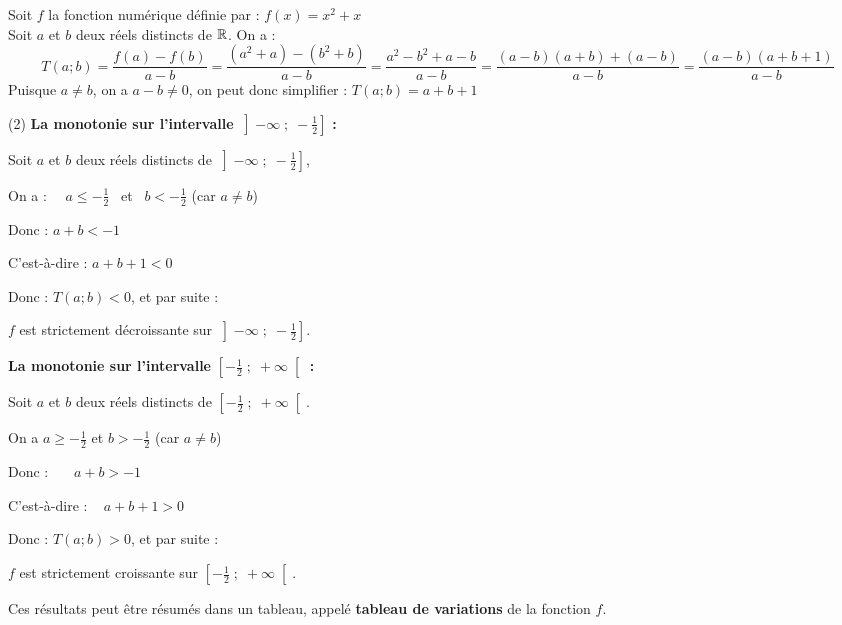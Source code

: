\documentclass[10pt, a4paper]{article}
\begin{document}
\begin{Exemple}[][20 min]
Soit $f$ la fonction numérique définie par : $f(x) = x^2 + x$ \\
Soit $a$ et $b$ deux réels distincts de $\mathbb{R}$. On a  :
\[ T(a ; b) = \frac{f(a) - f(b)}{a - b}  = \frac{(a^2 + a) - (b^2 + b)}{a - b} = \frac{a^2 - b^2 + a - b}{a - b}
 = \frac{(a - b)(a + b) + (a - b)}{a - b}
 = \frac{(a - b)(a + b + 1)}{a - b} \]
Puisque $a \neq b$, on a $a - b \neq 0$, on peut donc simplifier :
 $T(a ; b) = a + b + 1$

\medskip
\begin{tasks}[label = \arabic*), label-width=15pt,item-indent=25pt,after-item-skip=5pt](2)
    \task \textbf{La monotonie sur l'intervalle } $\left]-\infty \;;\; -\frac{1}{2}\right]$ \textbf{:}

Soit $a$ et $b$ deux réels distincts de $\left]-\infty \;;\; -\frac{1}{2}\right]$,

On a :~~ $a \leq -\frac{1}{2}$ ~et~ $b < -\frac{1}{2}$  (car $a \neq b$)

Donc : \qquad  $a + b < -1$

C'est-à-dire :  $a + b + 1 < 0$

Donc : $T(a ; b) < 0$, et par suite :

$f$ est strictement décroissante sur $\left]-\infty \;;\; -\frac{1}{2}\right]$.
    
    \task \textbf{La monotonie sur l'intervalle } $\left[-\frac{1}{2} \;;\; +\infty\right[$ \textbf{:}

Soit $a$ et $b$ deux réels distincts de $\left[-\frac{1}{2} \;;\; +\infty\right[$.

On a $a \geq -\frac{1}{2}$ et $b > -\frac{1}{2}$ \quad (car $a \neq b$)

Donc :~~~ $a + b > -1$

C'est-à-dire : ~ $a + b + 1 > 0$

Donc : $T(a ; b) > 0$, et par suite :

$f$ est strictement croissante sur $\left[-\frac{1}{2} \;;\; +\infty\right[$.

\end{tasks}



\medskip



Ces résultats peut être résumés dans un tableau, appelé \textbf{tableau de variations} de la fonction $f$.
\vspace{0.2cm}
\begin{center}
\end{center}

\end{Exemple}
\end{document}
